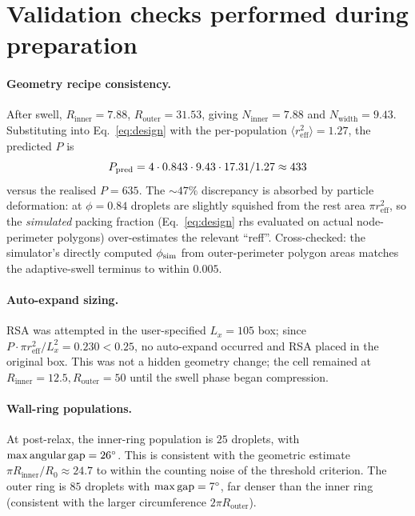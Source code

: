 \documentclass[aps,pre,twocolumn,floatfix,longbibliography]{revtex4-2}
\newcommand{\reff}{r_{\mathrm{eff}}}
\newcommand{\Ninner}{N_{\mathrm{inner}}}
\newcommand{\Nwidth}{N_{\mathrm{width}}}
\newcommand{\Rinner}{R_{\mathrm{inner}}}
\newcommand{\Router}{R_{\mathrm{outer}}}
\begin{document}
\section{Validation checks performed during preparation}
\label{sec:validation}

\paragraph*{Geometry recipe consistency.}
After swell, $\Rinner = 7.88$, $\Router = 31.53$, giving
$\Ninner = 7.88$ and $\Nwidth = 9.43$.  Substituting into
Eq.~\ref{eq:design} with the per-population
$\langle \reff^2 \rangle = 1.27$, the predicted $P$ is
\begin{equation*}
P_{\rm pred} = 4 \cdot 0.843 \cdot 9.43 \cdot 17.31 / 1.27 \approx 433
\end{equation*}
versus the realised $P = 635$.  The $\sim 47\%$ discrepancy is
absorbed by particle deformation: at $\phi = 0.84$ droplets are
slightly squished from the rest area $\pi \reff^2$, so the
\emph{simulated} packing fraction (Eq.~\ref{eq:design} rhs evaluated
on actual node-perimeter polygons) over-estimates the relevant
``reff''.  Cross-checked: the simulator's directly computed
$\phi_{\rm sim}$ from outer-perimeter polygon areas matches the
adaptive-swell terminus to within $0.005$.

\paragraph*{Auto-expand sizing.}
RSA was attempted in the user-specified $L_x = 105$ box; since
$P \cdot \pi \reff^2 / L_x^2 = 0.230 < 0.25$, no auto-expand occurred
and RSA placed in the original box.  This was not a hidden geometry
change; the cell remained at $\Rinner = 12.5, \Router = 50$ until
the swell phase began compression.

\paragraph*{Wall-ring populations.}
At post-relax, the inner-ring population is $25$ droplets, with
$\max{\rm angular\,gap} = 26^\circ$.  This is consistent with the
geometric estimate $\pi \Rinner / R_0 \approx 24.7$ to within the
counting noise of the threshold criterion.  The outer ring is
$85$ droplets with $\max{\rm gap} = 7^\circ$, far denser than the
inner ring (consistent with the larger circumference $2\pi \Router$).
\end{document}
